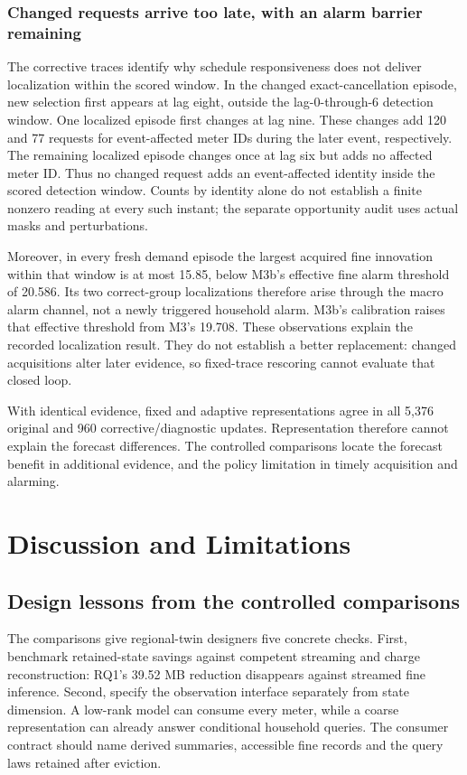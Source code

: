 \documentclass[conference]{IEEEtran}
\begin{document}
\subsubsection{Changed requests arrive too late, with an alarm barrier remaining}
The corrective traces identify why schedule responsiveness does not deliver localization within the scored window. In the changed exact-cancellation episode, new selection first appears at lag eight, outside the lag-0-through-6 detection window. One localized episode first changes at lag nine. These changes add 120 and 77 requests for event-affected meter IDs during the later event, respectively. The remaining localized episode changes once at lag six but adds no affected meter ID. Thus no changed request adds an event-affected identity inside the scored detection window. Counts by identity alone do not establish a finite nonzero reading at every such instant; the separate opportunity audit uses actual masks and perturbations.

Moreover, in every fresh demand episode the largest acquired fine innovation within that window is at most 15.85, below M3b's effective fine alarm threshold of 20.586. Its two correct-group localizations therefore arise through the macro alarm channel, not a newly triggered household alarm. M3b's calibration raises that effective threshold from M3's 19.708. These observations explain the recorded localization result. They do not establish a better replacement: changed acquisitions alter later evidence, so fixed-trace rescoring cannot evaluate that closed loop.

With identical evidence, fixed and adaptive representations agree in all 5,376 original and 960 corrective/diagnostic updates. Representation therefore cannot explain the forecast differences. The controlled comparisons locate the forecast benefit in additional evidence, and the policy limitation in timely acquisition and alarming.

\section{Discussion and Limitations}
\subsection{Design lessons from the controlled comparisons}
The comparisons give regional-twin designers five concrete checks. First, benchmark retained-state savings against competent streaming and charge reconstruction: RQ1's 39.52 MB reduction disappears against streamed fine inference. Second, specify the observation interface separately from state dimension. A low-rank model can consume every meter, while a coarse representation can already answer conditional household queries. The consumer contract should name derived summaries, accessible fine records and the query laws retained after eviction.
\end{document}

